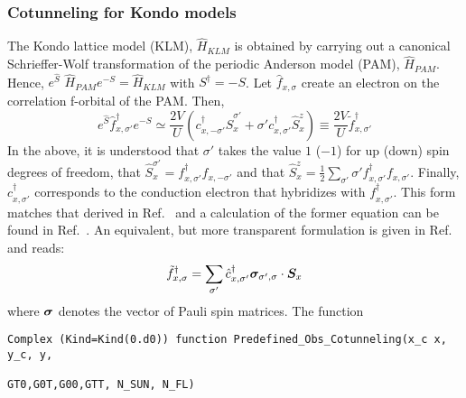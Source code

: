 

\subsubsection{ Cotunneling   for Kondo models}

The  Kondo lattice model (KLM), $\hat{H}_{KLM}$   is obtained by carrying out a   canonical Schrieffer-Wolf  \cite{Schrieffer66}  transformation  of the   periodic Anderson model (PAM), $\hat{H}_{PAM}$.    Hence, $e^{\hat{S}}  $ $\hat{H}_{PAM} $$ e^{-S}   = \hat{H}_{KLM}$  with  $S^\dagger = - S$.     Let $\hat{f}_{x,\sigma} $  create an  electron on the   correlation f-orbital of the   PAM.  Then, 
\begin{equation}
	e^{\hat{S}} \hat{f}^{\dagger}_{x,\sigma'} e^{-S}   \simeq  
     \frac{2V}{U}  \left( c^{\dagger}_{x,-\sigma'}  \hat{S}^{\sigma'}_{x} +  \sigma'   c^{\dagger}_{x,\sigma'} \hat{S}^{z}_x   \right)  \equiv  \frac{2V}{U}   \tilde{f}^{\dagger}_{x,\sigma'}    
\end{equation}
In the above, it is understood that $\sigma'$ takes the value $1$ ($-1$)  for up  (down) spin degrees of freedom, that  $  \hat{S}^{\sigma'}_{x} =  f^{\dagger}_{x,\sigma'} f^{}_{x,-\sigma'}  $  and that 
$ \hat{S}^{z}_{x} = \frac{1}{2} \sum_{\sigma'}  \sigma' f^{\dagger}_{x,\sigma'} f^{}_{x,\sigma'} $.  Finally, $c^{\dagger}_{x,\sigma'}$ corresponds to the conduction electron that hybridizes with $f^{\dagger}_{x,\sigma'}$.  This form matches that derived in Ref.~\cite{Costi00} and a  calculation  of the former equation can be found in Ref.~\cite{Raczkowski18}.  An equivalent, but more transparent formulation is given in  Ref.~\cite{Maltseva09}   and reads: 
\begin{equation}
	\tilde{f}^{\dagger}_{x,\sigma} = \sum_{\sigma'} \hat{c}^{\dagger}_{x,\sigma'} \boldsymbol{\sigma}_{\sigma',\sigma} \cdot  \boldsymbol{S}_x
\end{equation}
where $\ve{\sigma}$  denotes  the vector of Pauli spin matrices.
The  function 
\begin{lstlisting}[style=fortran]
Complex (Kind=Kind(0.d0)) function Predefined_Obs_Cotunneling(x_c x, y_c, y,  
                                                          GT0,G0T,G00,GTT, N_SUN, N_FL)

\end{lstlisting}$$
